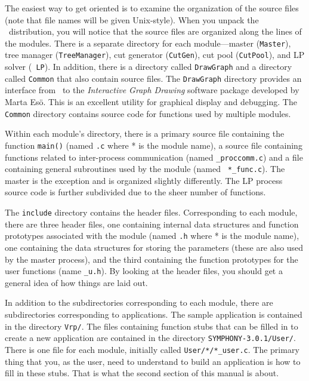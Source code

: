 The easiest way to get oriented is to examine the organization of the source
files (note that file names will be given Unix-style). When you unpack the
\BB\ distribution, you will notice that the source files are organized along
the lines of the modules.  There is a separate directory for each
module---master ({\tt Master}), tree manager ({\tt TreeManager}), cut
generator ({\tt CutGen}), cut pool ({\tt CutPool}), and LP solver ({\tt
LP}). In addition, there is a directory called {\tt DrawGraph} and a directory
called {\tt Common} that also contain source files. The {\tt DrawGraph}
directory provides an interface from \BB\ to the {\em Interactive Graph
Drawing} software package developed by Marta Es\"o. This is an excellent
utility for graphical display and debugging. The {\tt Common} directory
contains source code for functions used by multiple modules.

Within each module's directory, there is a primary source file
containing the function {\tt main()} (named {\tt *.c} where * is the
module name), a source file containing functions related to
inter-process communication (named {\tt *\_proccomm.c}) and a file
containing general subroutines used by the module (named {\tt
*\_func.c}). The master is the exception and is organized slightly
differently. The LP process source code is further subdivided due to
the sheer number of functions.

The {\tt include} directory contains the header files. Corresponding
to each module, there are three header files, one containing internal
data structures and function prototypes associated with the module
(named {\tt *.h} where * is the module name), one containing the data
structures for storing the parameters (these are also used by the
master process), and the third containing the function prototypes for
the user functions (name {\tt *\_u.h}). By looking at the header files, you
should get a general idea of how things are laid out.

In addition to the subdirectories corresponding to each module, there are
subdirectories corresponding to applications. The sample application is
contained in the directory {\tt Vrp/}. The files containing function stubs
that can be filled in to create a new application are contained in the
directory {\tt SYMPHONY-3.0.1/User/}. There is one file for each module,
initially called {\tt User/*/*\_user.c}. The primary thing that
you, as the user, need to understand to build an application is how to fill in
these stubs. That is what the second section of this manual is about.

